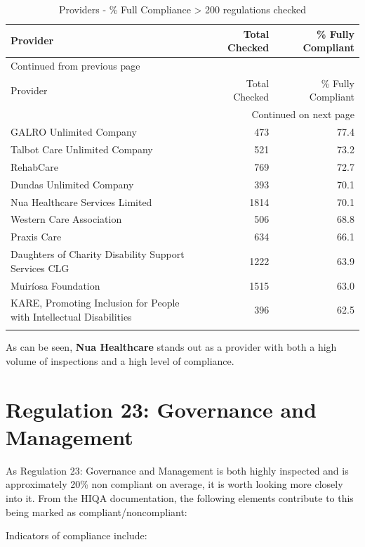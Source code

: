\documentclass[a4paper,11pt,twoside]{article}
\begin{document}
\begin{longtable}{p{10cm}|r|r}
\caption{Providers - \% Full Compliance > 200 regulations checked}
\\[0pt]
Provider & Total Checked & \% Fully Compliant\\[0pt]
\hline
\endfirsthead
\multicolumn{3}{l}{Continued from previous page} \\[0pt]
\hline

Provider & Total Checked & \% Fully Compliant \\[0pt]

\hline
\endhead
\hline\multicolumn{3}{r}{Continued on next page} \\
\endfoot
\endlastfoot
\hline
GALRO Unlimited Company & 473 & 77.4\\[0pt]
Talbot Care Unlimited Company & 521 & 73.2\\[0pt]
RehabCare & 769 & 72.7\\[0pt]
Dundas Unlimited Company & 393 & 70.1\\[0pt]
Nua Healthcare Services Limited & 1814 & 70.1\\[0pt]
Western Care Association & 506 & 68.8\\[0pt]
Praxis Care & 634 & 66.1\\[0pt]
Daughters of Charity Disability Support Services CLG & 1222 & 63.9\\[0pt]
Muiríosa Foundation & 1515 & 63.0\\[0pt]
KARE, Promoting Inclusion for People with Intellectual Disabilities & 396 & 62.5\\[0pt]
 &  & \\[0pt]
\end{longtable}


As can be seen, \textbf{Nua Healthcare} stands out as a provider with both a high volume of inspections and a high level of compliance.
\section{Regulation 23: Governance and Management}
\label{sec:org55780b7}

As Regulation 23: Governance and Management is both highly inspected and is approximately 20\% non compliant on average, it is worth looking more closely into it. From the HIQA documentation, the following elements contribute to this being marked as compliant/noncompliant:

Indicators of compliance include:
\end{document}
